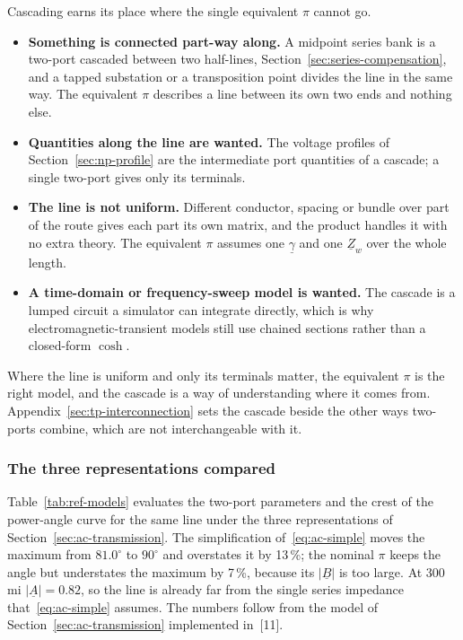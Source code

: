 Cascading earns its place where the single equivalent $\pi$ cannot go.

\begin{itemize}
  \setlength{\itemsep}{0.35em}
  \item \textbf{Something is connected part-way along.} A midpoint series
        bank is a two-port cascaded between two half-lines,
        Section~\ref{sec:series-compensation}, and a tapped substation or a
        transposition point divides the line in the same way. The
        equivalent $\pi$ describes a line between its own two ends and
        nothing else.
  \item \textbf{Quantities along the line are wanted.} The voltage profiles
        of Section~\ref{sec:np-profile} are the intermediate port
        quantities of a cascade; a single two-port gives only its terminals.
  \item \textbf{The line is not uniform.} Different conductor, spacing or
        bundle over part of the route gives each part its own matrix, and
        the product handles it with no extra theory. The equivalent $\pi$
        assumes one $\underline{\gamma}$ and one $\underline{Z}_w$ over the
        whole length.
  \item \textbf{A time-domain or frequency-sweep model is wanted.} The
        cascade is a lumped circuit a simulator can integrate directly,
        which is why electromagnetic-transient models still use chained
        sections rather than a closed-form $\cosh$.
\end{itemize}

Where the line is uniform and only its terminals matter, the equivalent
$\pi$ is the right model, and the cascade is a way of understanding where it
comes from. Appendix~\ref{sec:tp-interconnection} sets the cascade beside
the other ways two-ports combine, which are not interchangeable with it.

\subsubsection{The three representations compared}
\label{sec:ref-models}

Table~\ref{tab:ref-models} evaluates the two-port parameters and the crest
of the power-angle curve for the same line under the three representations
of Section~\ref{sec:ac-transmission}. The simplification
of~\eqref{eq:ac-simple} moves the maximum from $81.0^\circ$ to $90^\circ$
and overstates it by 13\,\%; the nominal $\pi$ keeps the angle but
understates the maximum by 7\,\%, because its $\left|\underline{B}\right|$
is too large. At 300\,mi $\left|\underline{A}\right| = 0.82$, so the line is
already far from the single series impedance that~\eqref{eq:ac-simple}
assumes. The numbers follow from the model of
Section~\ref{sec:ac-transmission} implemented in~[11].

